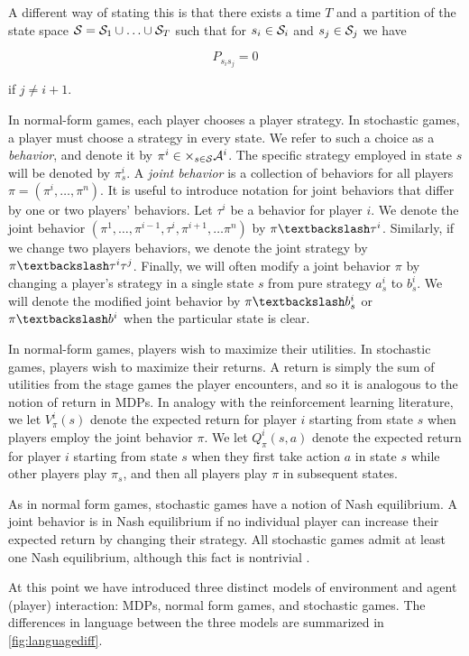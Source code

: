A different way of stating this is that there exists a time $T$ and a partition of the state space $\mathcal{S} = \mathcal{S}_1 \cup \ldots \cup \mathcal{S}_T$ such that for $s_i \in \mathcal{S}_i$ and $s_j \in \mathcal{S}_j$ we have

$$
P_{s_is_j} = 0
$$

if $j \neq i + 1$.


In normal-form games, each player chooses a player strategy. In stochastic games, a player must choose a strategy in every state. We refer to such a choice as a {\em behavior}, and denote it by $\pi^i \in \times_{s \in \mathcal{S}} \mathcal{A}^i$. The specific strategy employed in state $s$ will be denoted by $\pi^i_s$. A {\em joint behavior} is a collection of behaviors for all players $\pi = (\pi^i, \ldots, \pi^n)$. It is useful to introduce notation for joint behaviors that differ by one or two players' behaviors. Let $\tau^i$ be a behavior for player $i$. We denote the joint behavior $(\pi^1, \ldots, \pi^{i-1}, \tau^i, \pi^{i+1}, \ldots \pi^n)$ by $\asub{\pi}{\tau^i}$. Similarly, if we change two players behaviors, we denote the joint strategy by $\asub{\pi}{\tau^i\tau^j}$. Finally, we will often modify a joint behavior $\pi$ by changing a player's strategy in a single state $s$ from pure strategy $a^i_s$ to $b^i_s$. We will denote the modified joint behavior by $\asub{\pi}{b^i_s}$ or $\asub{\pi}{b^i}$ when the particular state is clear.

In normal-form games, players wish to maximize their utilities. In stochastic games, players wish to maximize their returns. A return is simply the sum of utilities from the stage games the player encounters, and so it is analogous to the notion of return in MDPs. In analogy with the reinforcement learning literature, we let $V^i_{\pi}(s)$ denote the expected return for player $i$ starting from state $s$ when players employ the joint behavior $\pi$. We let $Q^i_{\pi}(s, a)$ denote the expected return for player $i$ starting from state $s$ when they first take action $a$ in state $s$ while other players play $\pi_s$, and then all players play $\pi$ in subsequent states.

As in normal form games, stochastic games have a notion of Nash equilibrium. A joint behavior is in Nash equilibrium if no individual player can increase their expected return by changing their strategy. All stochastic games admit at least one Nash equilibrium, although this fact is nontrivial \cite{filar2012competitive, shapley1953stochastic}.

At this point we have introduced three distinct models of environment and agent (player) interaction: MDPs, normal form games, and stochastic games. The differences in language between the three models are summarized in \ref{fig:languagediff}.

